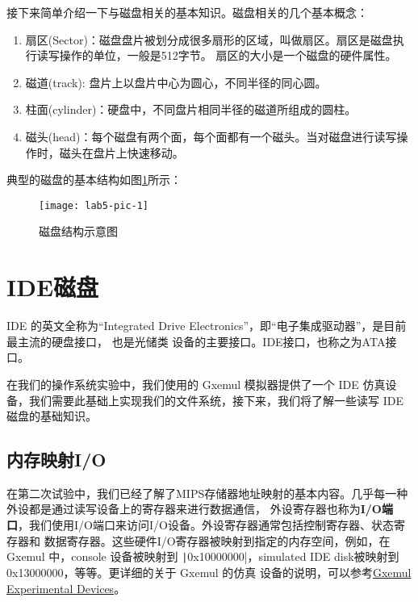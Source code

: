 接下来简单介绍一下与磁盘相关的基本知识。磁盘相关的几个基本概念：

\begin{enumerate}
  \item 扇区(Sector)：磁盘盘片被划分成很多扇形的区域，叫做扇区。扇区是磁盘执行读写操作的单位，一般是512字节。
  扇区的大小是一个磁盘的硬件属性。
  \item 磁道(track): 盘片上以盘片中心为圆心，不同半径的同心圆。
  \item 柱面(cylinder)：硬盘中，不同盘片相同半径的磁道所组成的圆柱。
  \item 磁头(head)：每个磁盘有两个面，每个面都有一个磁头。当对磁盘进行读写操作时，磁头在盘片上快速移动。
\end{enumerate}

典型的磁盘的基本结构如图\ref{lab5-pic-1}所示：

\begin{figure}[htbp]
  \centering
  \texttt{[image: lab5-pic-1]}
  \caption{磁盘结构示意图}\label{lab5-pic-1}
\end{figure}

\section{IDE磁盘}

\begin{note}
IDE 的英文全称为“Integrated Drive Electronics”，即“电子集成驱动器”，是目前最主流的硬盘接口， 也是光储类
设备的主要接口。IDE接口，也称之为ATA接口。
\end{note}

在我们的操作系统实验中，我们使用的 Gxemul 模拟器提供了一个 IDE 
仿真设备，我们需要此基础上实现我们的文件系统，接下来，我们将了解一些读写 IDE 磁盘的基础知识。

\subsection{内存映射I/O}

在第二次试验中，我们已经了解了MIPS存储器地址映射的基本内容。几乎每一种外设都是通过读写设备上的寄存器来进行数据通信，
外设寄存器也称为\textbf{I/O端口}，我们使用I/O端口来访问I/O设备。外设寄存器通常包括控制寄存器、状态寄存器和
数据寄存器。这些硬件I/O寄存器被映射到指定的内存空间，例如，在 Gxemul 中，console 设备被映射到
\texttt|0x10000000|，simulated IDE disk被映射到 0x13000000，等等。更详细的关于 Gxemul 的仿真
设备的说明，可以参考\href{http://gxemul.sourceforge.net/gxemul-stable/doc/experiments.html}{Gxemul
Experimental Devices}。

